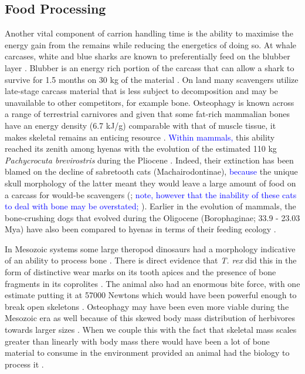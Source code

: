 \documentclass[a4paper,12pt]{article}
\begin{document}
\subsection{Food Processing}
Another vital component of carrion handling time is the ability to maximise the energy gain from the remains while reducing the energetics of doing so. 
At whale carcases, white and blue sharks are known to preferentially feed on the blubber layer \citep{long1996sharks}. 
Blubber is an energy rich portion of the carcass that can allow a shark to survive for 1.5 months on 30 kg of the material \citep{carey1982temperature}. 
On land many scavengers utilize late-stage carcass material that is less subject to decomposition and may be unavailable to other competitors, for example bone.
Osteophagy is known across a range of terrestrial carnivores and given that some fat-rich mammalian bones have an energy density (6.7 kJ/g) comparable with that of muscle tissue, it makes skeletal remains an enticing resource \citep{brown1989study}.
\textcolor{blue}{Within mammals,} this ability reached its zenith among hyenas with the evolution of the estimated 110 kg \textit{Pachycrocuta brevirostris} during the Pliocene \citep[3.6 - 2.58 Mya; ][]{palmqvist2011giant}.
Indeed, their extinction has been blamed on the decline of sabretooth cats (Machairodontinae), \textcolor{blue}{because} the unique skull morphology of the latter meant they would leave a large amount of food on a carcass for would-be scavengers (\citealt{palmqvist2011giant}; \textcolor{blue}{note, however that the inability of these cats to deal with bone may be overstated; \citealt{binder2010comparison}}). 
Earlier in the evolution of mammals, the bone-crushing dogs that evolved during the Oligocene (Borophaginae; 33.9 - 23.03 Mya) have also been compared to hyenas in terms of their feeding ecology \citep{van2003chapter,martin2016pursuit}.

In Mesozoic systems some large theropod dinosaurs had a morphology indicative of an ability to process bone \citep[e.g. the robust skull and dentition of \textit{Tyrannosaurus rex;}][]{hone2010feeding}.
There is direct evidence that \textit{T. rex} did this in the form of distinctive wear marks on its tooth apices \citep{farlow1994wear,schubert2005wear} and the presence of bone fragments in its coprolites \citep{chin1998king}.
The animal also had an enormous bite force, with one estimate putting it at 57000 Newtons \citep{bates2012estimating} which would have been powerful enough to break open skeletons \citep{rayfield2001cranial}.
Osteophagy may have been even more viable during the Mesozoic era as well because of this skewed body mass distribution of herbivores towards larger sizes \citep{10.1371/journal.pone.0051925}.
When we couple this with the fact that skeletal mass scales greater than linearly with body mass \citep{prange1979scaling} there would have been a lot of bone material to consume in the environment provided an animal had the biology to process it \citep{chure1997one}.
\end{document}
